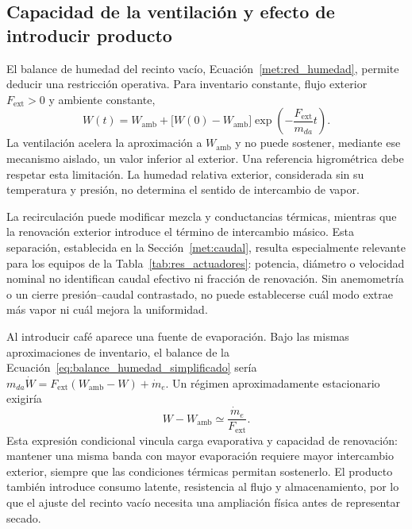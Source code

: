 \subsection{Capacidad de la ventilación y efecto de introducir producto}

El balance de humedad del recinto vacío, Ecuación~\eqref{met:red_humedad}, permite deducir una restricción operativa. Para inventario constante, flujo exterior $F_{\mathrm{ext}}>0$ y ambiente constante,
\begin{equation}
W(t)=W_{\mathrm{amb}}+
\bigl[W(0)-W_{\mathrm{amb}}\bigr]
\exp\left(-\frac{F_{\mathrm{ext}}}{m_{da}}t\right).
\label{eq:dis_relajacion_humedad}
\end{equation}
La ventilación acelera la aproximación a $W_{\mathrm{amb}}$ y no puede sostener, mediante ese mecanismo aislado, un valor inferior al exterior. Una referencia higrométrica debe respetar esta limitación. La humedad relativa exterior, considerada sin su temperatura y presión, no determina el sentido de intercambio de vapor.

La recirculación puede modificar mezcla y conductancias térmicas, mientras que la renovación exterior introduce el término de intercambio másico. Esta separación, establecida en la Sección~\ref{met:caudal}, resulta especialmente relevante para los equipos de la Tabla~\ref{tab:res_actuadores}: potencia, diámetro o velocidad nominal no identifican caudal efectivo ni fracción de renovación. Sin anemometría o un cierre presión--caudal contrastado, no puede establecerse cuál modo extrae más vapor ni cuál mejora la uniformidad.

Al introducir café aparece una fuente de evaporación. Bajo las mismas aproximaciones de inventario, el balance de la Ecuación~\eqref{eq:balance_humedad_simplificado} sería $m_{da}\dot W=F_{\mathrm{ext}}(W_{\mathrm{amb}}-W)+\dot m_e$. Un régimen aproximadamente estacionario exigiría
\begin{equation}
W-W_{\mathrm{amb}}\simeq\frac{\dot m_e}{F_{\mathrm{ext}}}.
\label{eq:dis_carga_ventilacion}
\end{equation}
Esta expresión condicional vincula carga evaporativa y capacidad de renovación: mantener una misma banda con mayor evaporación requiere mayor intercambio exterior, siempre que las condiciones térmicas permitan sostenerlo. El producto también introduce consumo latente, resistencia al flujo y almacenamiento, por lo que el ajuste del recinto vacío necesita una ampliación física antes de representar secado.

